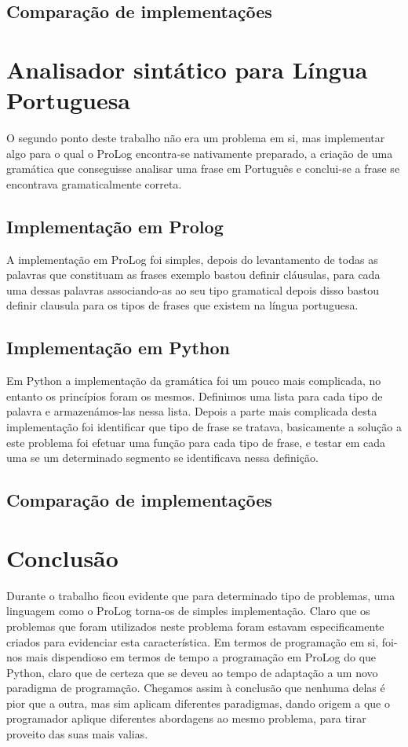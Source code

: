 \documentclass[12pt,a4paper]{report}
\begin{document}
\subsection{Comparação de implementações}

\section{Analisador sintático para Língua Portuguesa}
O segundo ponto deste trabalho não era um problema em si, mas implementar algo para o qual o ProLog encontra-se nativamente preparado, a criação de uma gramática que conseguisse analisar uma frase em Português e conclui-se a frase se encontrava gramaticalmente correta.
\subsection{Implementação em Prolog}
A implementação em ProLog foi simples, depois do levantamento de todas as palavras que constituam as frases exemplo bastou definir cláusulas, para cada uma dessas palavras associando-as ao seu tipo gramatical depois disso bastou definir clausula para os tipos de frases que existem na língua portuguesa.
\subsection{Implementação em Python}
Em Python a implementação da gramática foi um pouco mais complicada, no entanto os princípios foram os mesmos. Definimos uma lista para cada tipo de palavra e armazenámos-las nessa lista. Depois a parte mais complicada desta implementação foi identificar que tipo de frase se tratava, basicamente a solução a este problema foi efetuar uma função para cada tipo de frase, e testar em cada uma se um determinado segmento se identificava nessa definição. 
\subsection{Comparação de implementações}

\section{Conclusão}
Durante o trabalho ficou evidente que para determinado tipo de problemas, uma linguagem como o ProLog torna-os de simples implementação. Claro que os problemas que foram utilizados neste problema foram estavam especificamente criados para evidenciar esta característica.
Em termos de programação em si, foi-nos mais dispendioso em termos de tempo a programação em ProLog do que Python, claro que de certeza que se deveu ao tempo de adaptação a um novo paradigma de programação.
Chegamos assim à conclusão que nenhuma delas é pior que a outra, mas sim aplicam diferentes paradigmas, dando origem a que o programador aplique diferentes abordagens ao mesmo problema, para tirar proveito das suas mais valias.
\end{document}
